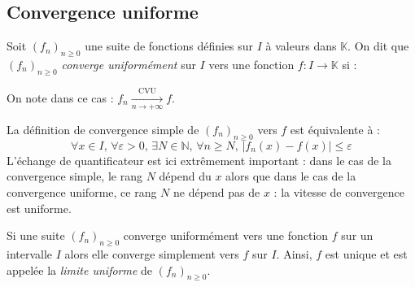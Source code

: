 \documentclass[a4paper,10pt]{report}
\begin{document}
\subsection{Convergence uniforme}

\begin{defin} Soit $(f_n)_{n \geq 0}$ une suite de fonctions définies sur $I$ à valeurs dans $\mathbb{K}$. On dit que $(f_n)_{n \geq 0}$ \textit{converge uniformément} sur $I$ vers une fonction $f : I \rightarrow \mathbb{K}$ si : 
$$\phantom{\forall \varepsilon >0, \, \exists N \in \mathbb{N}, \, \forall n \geq N, \, \forall x \in I, \, \vert f_n(x)-f(x) \vert \leq \varepsilon}$$
On note dans ce cas : $f_n \xrightarrow[n \rightarrow + \infty]{\textrm{CVU}} f$.
\end{defin}

%


\begin{rem} 
La définition de convergence simple de $(f_n)_{n \geq 0}$ vers $f$ est équivalente à :
$$ \forall x \in I, \,  \forall \varepsilon >0, \, \exists N \in \mathbb{N}, \, \forall n \geq N,  \, \vert f_n(x)-f(x) \vert \leq \varepsilon$$
L'échange de quantificateur est ici extrêmement important : dans le cas de la convergence simple, le rang $N$ dépend du $x$ alors que dans le cas de la convergence uniforme, ce rang $N$ ne dépend pas de $x$ : la \og vitesse \fg de convergence est uniforme.
\end{rem}

\begin{prop}  Si une suite $(f_n)_{n \geq 0}$ converge uniformément vers une fonction $f$ sur un intervalle $I$ alors elle converge simplement vers $f$ sur $I$. Ainsi, $f$ est unique et est appelée la \textit{limite uniforme} de $(f_n)_{n \geq 0}$.
\end{prop}
\begin{preuve}
\vspace{5cm}
\end{preuve}
\end{document}
